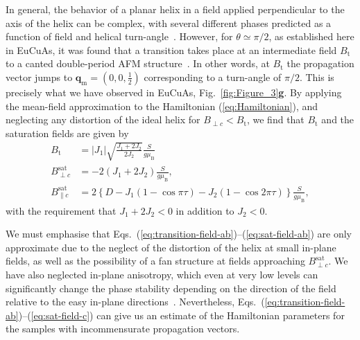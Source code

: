\documentclass[aps,prl,amsmath,amssymb,amstext,citeautoscript,punctuation,nofootinbib,superscriptaddress,twocolumn]{revtex4-1}
\begin{document}
In general, the behavior of a planar helix in a field applied perpendicular to the axis of the helix can be complex, with several different phases predicted as a function of field and helical turn-angle~\cite{Yoshimori1959,Nagamiya1962,Kitano1964,Robinson1970,Johnston2017}.  However, for $\theta \simeq\pi/2$, as established here in EuCuAs, it was found that a transition takes place at an intermediate field $B_\textrm{t}$ to a canted double-period AFM structure~\cite{Nagamiya1962}. In other words, at $B_\textrm{t}$ the propagation vector jumps to $\textbf{q}_\textrm{m} = (0,0,\frac{1}{2})$ corresponding to a turn-angle of $\pi/2$. This is precisely what we have observed in EuCuAs, Fig.~\ref{fig:Figure_3}\textbf{g}. By applying the mean-field approximation to the Hamiltonian (\ref{eq:Hamiltonian}), and neglecting any distortion of the ideal helix for $B_{\perp c}<B_\textrm{t}$, we find that $B_\textrm{t}$ and the saturation fields are given by
\begin{align}
B_\textrm{t} & = |J_1|\sqrt{\frac{J_1+2J_2}{2J_2}}\frac{S}{g \mu_\textrm{B}}
\label{eq:transition-field-ab}\\[5pt]
B_{\perp c}^\textrm{sat} & = -2(J_1+2J_2)\frac{S}{g \mu_\textrm{B}},
\label{eq:sat-field-ab}\\[5pt]
B_{\parallel c}^\textrm{sat} & = 2\left\{D -J_1(1-\cos\pi\tau)-J_2(1-\cos 2\pi\tau)\right\}\frac{S}{g \mu_\textrm{B}},
\label{eq:sat-field-c}
\end{align}
with the requirement that $J_1+2J_2 < 0$ in addition to $J_2<0$.

We must emphasise that Eqs.~(\ref{eq:transition-field-ab})--(\ref{eq:sat-field-ab}) are only approximate due to the neglect of the distortion of the helix at small in-plane fields, as well as the possibility of a fan structure at fields approaching $B_{\perp c}^\textrm{sat}$.  We have also neglected in-plane anisotropy, which even at very low levels can significantly change the phase stability depending on the direction of the field relative to the easy in-plane directions~\cite{Kitano1964,Robinson1970}. Nevertheless, Eqs.~(\ref{eq:transition-field-ab})--(\ref{eq:sat-field-c}) can give us an estimate of the Hamiltonian parameters for the samples with incommensurate propagation vectors. 
\end{document}

